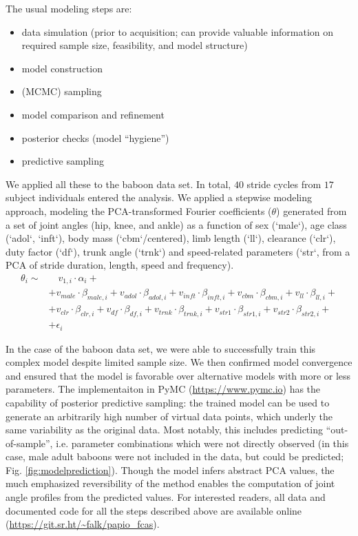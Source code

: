 \documentclass[10pt,a4paper]{article}
\begin{document}
The usual modeling steps are:
\begin{itemize}
\item data simulation (prior to acquisition; can provide valuable information on required sample size, feasibility, and model structure)
\item model construction
\item (MCMC) sampling
\item model comparison and refinement
\item posterior checks (model ``hygiene'')
\item predictive sampling
\end{itemize}


We applied all these to the baboon data set.
In total, \(40\) stride cycles from \(17\) subject individuals entered the analysis.
We applied a stepwise modeling approach, modeling the PCA-transformed Fourier coefficients (\(\theta\)) generated from a set of joint angles (hip, knee, and ankle) as a function of sex (`male`), age class (`adol`, `inft`), body mass (`cbm`/centered), limb length (`ll`), clearance (`clr`), duty factor (`df`), trunk angle (`trnk`) and speed-related parameters (`str`, from a PCA of stride duration, length, speed and frequency).
\begin{equation}
\begin{split}
 \theta_{i}  \sim &\quad v_{1,i}\cdot\alpha_{i} +
\\ & + v_{male}\cdot\beta_{male,i} + v_{adol}\cdot\beta_{adol,i} + v_{inft}\cdot\beta_{inft,i} + v_{cbm}\cdot\beta_{cbm,i}+ v_{ll}\cdot\beta_{ll,i} +
\\ & + v_{clr}\cdot\beta_{clr,i} + v_{df}\cdot\beta_{df,i} + v_{trnk}\cdot\beta_{trnk,i} + v_{str1}\cdot\beta_{str1,i} + v_{str2}\cdot\beta_{str2,i} +
\\ & + \epsilon_{i}
\end{split}
 \label{eq:jap} \end{equation}


In the case of the baboon data set, we were able to successfully train this complex model despite limited sample size.
We then confirmed model convergence and ensured that the model is favorable over alternative models with more or less parameters.
The implementaiton in PyMC (\url{https://www.pymc.io}) has the capability of posterior predictive sampling: the trained model can be used to generate an arbitrarily high number of virtual data points, which underly the same variability as the original data.
Most notably, this includes predicting ``out-of-sample'', i.e. parameter combinations which were not directly observed (in this case, male adult baboons were not included in the data, but could be predicted; Fig. \ref{fig:modelprediction}).
Though the model infers abstract PCA values, the much emphasized reversibility of the method enables the computation of joint angle profiles from the predicted values.
For interested readers, all data and documented code for all the steps described above are available online (\url{https://git.sr.ht/\~falk/papio\_fcas}).
\end{document}
